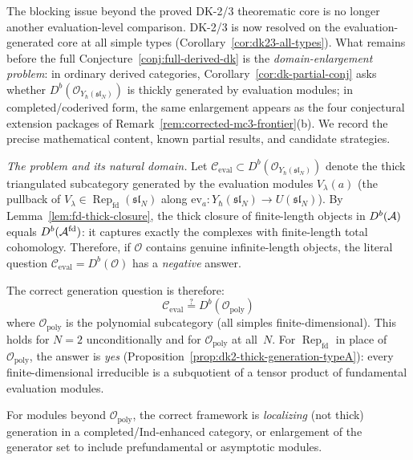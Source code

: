 \begin{remark}
\label{rem:cat-o-generation-obstruction}
The blocking issue beyond the proved DK-2/3 theorematic core is no
longer another evaluation-level comparison.  DK-2/3 is now resolved on
the evaluation-generated core at all simple types
\textup{(}Corollary~\ref{cor:dk23-all-types}\textup{)}.  What remains
before the full Conjecture~\ref{conj:full-derived-dk} is the
\emph{domain-enlargement problem}: in ordinary derived categories,
Corollary~\ref{cor:dk-partial-conj} asks whether
$D^b(\mathcal{O}_{Y_\hbar(\mathfrak{sl}_N)})$ is thickly generated by
evaluation modules; in completed/coderived form, the same enlargement
appears as the four conjectural extension packages of
Remark~\ref{rem:corrected-mc3-frontier}(b).  We record the precise
mathematical content, known partial results, and candidate strategies.

\emph{The problem and its natural domain.}
Let $\mathcal{C}_{\mathrm{eval}} \subset
D^b(\mathcal{O}_{Y_\hbar(\mathfrak{sl}_N)})$ denote the thick
triangulated subcategory generated by the evaluation modules
$V_\lambda(a)$ (the pullback of $V_\lambda \in
\operatorname{Rep}_{\mathrm{fd}}(\mathfrak{sl}_N)$ along
$\mathrm{ev}_a\colon Y_\hbar(\mathfrak{sl}_N) \to
U(\mathfrak{sl}_N)$).
By Lemma~\ref{lem:fd-thick-closure}, the thick closure of
finite-length objects in $D^b(\mathcal{A})$ equals $D^b(\mathcal{A}^{\mathrm{fd}})$:
it captures exactly the complexes with finite-length total
cohomology.  Therefore, if $\mathcal{O}$ contains genuine
infinite-length objects, the literal question
$\mathcal{C}_{\mathrm{eval}} = D^b(\mathcal{O})$ has a
\emph{negative} answer.

The correct generation question is therefore:
\[
\mathcal{C}_{\mathrm{eval}} \stackrel{?}{=}
D^b(\mathcal{O}_{\mathrm{poly}})
\]
where $\mathcal{O}_{\mathrm{poly}}$ is the polynomial subcategory
(all simples finite-dimensional).  This holds for $N = 2$
unconditionally and for $\mathcal{O}_{\mathrm{poly}}$ at all~$N$.
For $\operatorname{Rep}_{\mathrm{fd}}$ in place of
$\mathcal{O}_{\mathrm{poly}}$,
the answer is \emph{yes}
(Proposition~\ref{prop:dk2-thick-generation-typeA}): every
finite-dimensional irreducible is a subquotient of a tensor product
of fundamental evaluation modules.

For modules beyond $\mathcal{O}_{\mathrm{poly}}$, the correct
framework is \emph{localizing} (not thick) generation in a
completed/Ind-enhanced category, or enlargement of the
generator set to include prefundamental or asymptotic modules.


\end{remark}
